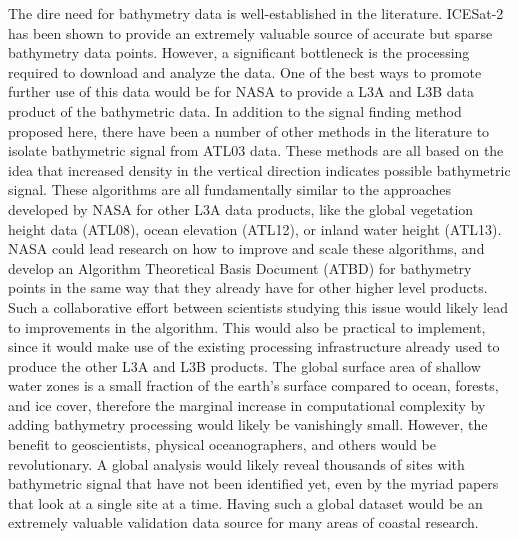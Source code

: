 The dire need for bathymetry data is well-established in the literature. ICESat-2 has been shown to provide an extremely valuable source of accurate but sparse bathymetry data points. However, a significant bottleneck is the processing required to download and analyze the data. One of the best ways to promote further use of this data would be for NASA to provide a L3A and L3B data product of the bathymetric data. 
In addition to the signal finding method proposed here, there have been a number of other methods in the literature to isolate bathymetric signal from ATL03 data. These methods are all based on the idea that increased density in the vertical direction indicates possible bathymetric signal. These algorithms are all fundamentally similar to the approaches developed by NASA for other L3A data products, like the global vegetation height data (ATL08), ocean elevation (ATL12), or inland water height (ATL13). NASA could lead research on how to improve and scale these algorithms, and develop an Algorithm Theoretical Basis Document (ATBD) for bathymetry points in the same way that they already have for other higher level products. Such a collaborative effort between scientists studying this issue would likely lead to improvements in the algorithm. This would also be practical to implement, since it would make use of the existing processing infrastructure already used to produce the other L3A and L3B products. The global surface area of shallow water zones is a small fraction of the earth's surface compared to ocean, forests, and ice cover, therefore the marginal increase in computational complexity by adding bathymetry processing would likely be vanishingly small. However, the benefit to geoscientists, physical oceanographers, and others would be revolutionary. A global analysis would likely reveal thousands of sites with bathymetric signal that have not been identified yet, even by the myriad papers that look at a single site at a time. Having such a global dataset would be an extremely valuable validation data source for many areas of coastal research. 
